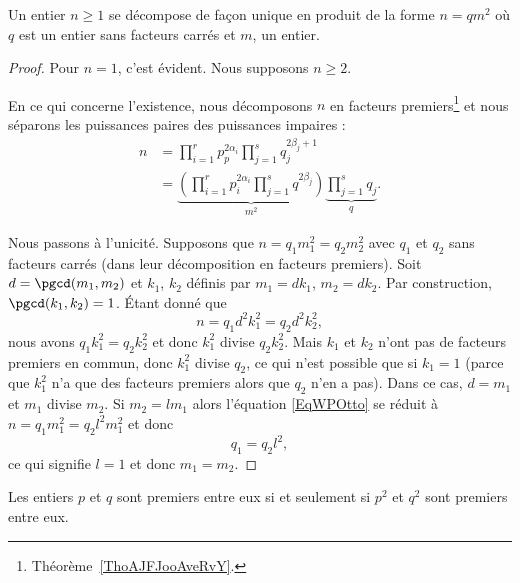 \begin{lemma}   \label{LemheKdsa}
    Un entier \( n\geq 1\) se décompose de façon unique en produit de la forme \( n=qm^2\) où \( q\) est un entier sans facteurs carrés et \( m\), un entier.
\end{lemma}

\begin{proof}
    Pour \( n=1\), c'est évident. Nous supposons \( n\geq 2\).

    En ce qui concerne l'existence, nous décomposons \( n\) en facteurs premiers\footnote{Théorème~\ref{ThoAJFJooAveRvY}.} et nous séparons les puissances paires des puissances impaires :
    \begin{subequations}
        \begin{align}
            n&=\prod_{i=1}^rp_p^{2\alpha_i}\prod_{j=1}^sq_{j}^{2\beta_j+1}\\
            &=\underbrace{\left( \prod_{i=1}^rp_i^{2\alpha_i}\prod_{j=1}^sq^{2\beta_j} \right)}_{m^2}\underbrace{\prod_{j=1}^sq_j}_{q}.
        \end{align}
    \end{subequations}

    Nous passons à l'unicité. Supposons que \( n=q_1m_1^2=q_2m_2^2\) avec \( q_1\) et \( q_2\) sans facteurs carrés (dans leur décomposition en facteurs premiers). Soit \( d=\pgcd(m_1,m_2)\) et \( k_1\), \( k_2\) définis par \( m_1=dk_1\), \( m_2=dk_2\). Par construction, \( \pgcd(k_1,k_2)=1\). Étant donné que
    \begin{equation}        \label{EqWPOtto}
        n=q_1d^2k_1^2=q_2d^2k_2^2,
    \end{equation}
    nous avons \( q_1k_1^2=q_2k_2^2\) et donc \( k_1^2\) divise \( q_2k_2^2\). Mais \( k_1\) et \( k_2\) n'ont pas de facteurs premiers en commun, donc \( k_1^2\) divise \( q_2\), ce qui n'est possible que si \( k_1=1\) (parce que \( k_1^2\) n'a que des facteurs premiers alors que \( q_2\) n'en a pas). Dans ce cas, \( d=m_1\) et \( m_1\) divise \( m_2\). Si \( m_2=lm_1\) alors l'équation \eqref{EqWPOtto} se réduit à  \( n=q_1m_1^2=q_2l^2m_1^2\) et donc
    \begin{equation}
        q_1=q_2l^2,
    \end{equation}
    ce qui signifie \( l=1\) et donc \( m_1=m_2\).
\end{proof}


\begin{proposition}     \label{PROPooRZDDooLJabov}
    Les entiers \( p\) et \( q\) sont premiers entre eux si et seulement si \( p^2\) et \( q^2\) sont premiers entre eux.
\end{proposition}

